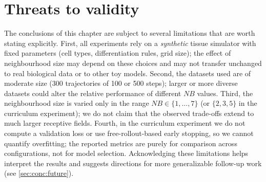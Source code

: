 \section{Threats to validity}
\label{sec:impl:threats}

The conclusions of this chapter are subject to several limitations that are worth stating explicitly.
First, all experiments rely on a \emph{synthetic} tissue simulator with fixed parameters (cell types, differentiation rules, grid size); the effect of neighbourhood size may depend on these choices and may not transfer unchanged to real biological data or to other toy models.
Second, the datasets used are of moderate size (300 trajectories of 100 or 500 steps); larger or more diverse datasets could alter the relative performance of different \(NB\) values.
Third, the neighbourhood size is varied only in the range \(NB \in \{1,\dots,7\}\) (or \(\{2,3,5\}\) in the curriculum experiment); we do not claim that the observed trade-offs extend to much larger receptive fields.
Fourth, in the curriculum experiment we do not compute a validation loss or use free-rollout-based early stopping, so we cannot quantify overfitting; the reported metrics are purely for comparison across configurations, not for model selection.
Acknowledging these limitations helps interpret the results and suggests directions for more generalizable follow-up work (see \cref{sec:conc:future}).
